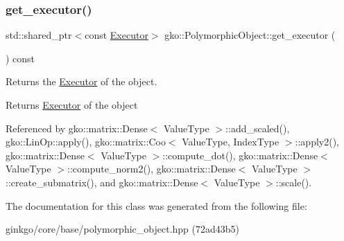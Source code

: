 \subsubsection{\texorpdfstring{get\+\_\+executor()}{get\_executor()}}
{\footnotesize\ttfamily std\+::shared\+\_\+ptr$<$const \hyperlink{classgko_1_1Executor}{Executor}$>$ gko\+::\+Polymorphic\+Object\+::get\+\_\+executor (\begin{DoxyParamCaption}{ }\end{DoxyParamCaption}) const\hspace{0.3cm}{\ttfamily [noexcept]}}



Returns the \hyperlink{classgko_1_1Executor}{Executor} of the object. 

\begin{DoxyReturn}{Returns}
\hyperlink{classgko_1_1Executor}{Executor} of the object 
\end{DoxyReturn}


Referenced by gko\+::matrix\+::\+Dense$<$ Value\+Type $>$\+::add\+\_\+scaled(), gko\+::\+Lin\+Op\+::apply(), gko\+::matrix\+::\+Coo$<$ Value\+Type, Index\+Type $>$\+::apply2(), gko\+::matrix\+::\+Dense$<$ Value\+Type $>$\+::compute\+\_\+dot(), gko\+::matrix\+::\+Dense$<$ Value\+Type $>$\+::compute\+\_\+norm2(), gko\+::matrix\+::\+Dense$<$ Value\+Type $>$\+::create\+\_\+submatrix(), and gko\+::matrix\+::\+Dense$<$ Value\+Type $>$\+::scale().



The documentation for this class was generated from the following file\+:\begin{DoxyCompactItemize}
\item 
ginkgo/core/base/polymorphic\+\_\+object.\+hpp (72ad43b5)\end{DoxyCompactItemize}
